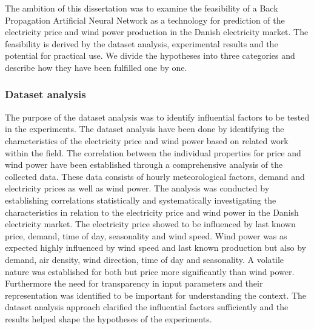 The ambition of this dissertation was to examine the feasibility of a Back Propagation Artificial Neural Network as a technology for prediction of the electricity price and wind power production in the Danish electricity market. The feasibility is derived by the dataset analysis, experimental results and the potential for practical use. We divide the hypotheses into three categories and describe how they have been fulfilled one by one.


\subsubsection{Dataset analysis}
The purpose of the dataset analysis was to identify influential factors to be tested in the experiments. The dataset analysis have been done by identifying the characteristics of the electricity price and wind power based on related work within the field. The correlation between the individual properties for price and wind power have been established through a comprehensive analysis of the collected data. These data consists of hourly meteorological factors, demand and electricity prices as well as wind power. The analysis was conducted by establishing correlations statistically and systematically investigating the characteristics in relation to the electricity price and wind power in the Danish electricity market. The electricity price showed to be influenced by last known price, demand, time of day, seasonality and wind speed. Wind power was as expected highly influenced by wind speed and last known production but also by demand, air density, wind direction, time of day and seasonality. A volatile nature was established for both but price more significantly than wind power. Furthermore the need for transparency in input parameters and their representation was identified to be important for understanding the context. The dataset analysis approach clarified the influential factors sufficiently and the results helped shape the hypotheses of the experiments. 
